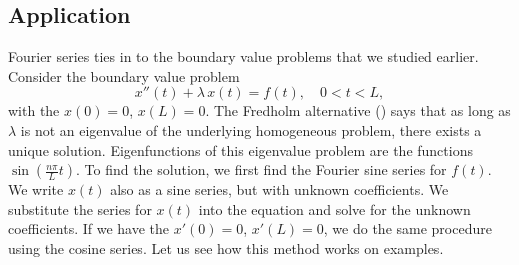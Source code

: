 \subsection{Application}

Fourier series ties in to the boundary value problems that
we studied earlier.
Consider the boundary value problem
\begin{equation*}
x''(t) + \lambda\, x(t) = f(t) , \quad 0 < t < L,
\end{equation*}
with the \emph{}
$x(0) = 0$, $x(L) = 0$.
The Fredholm alternative ()
says that
as long as $\lambda$ is not an eigenvalue of the underlying homogeneous
problem, there exists a unique solution.
Eigenfunctions of this eigenvalue problem are the functions
$\sin \left( \frac{n \pi}{L} t \right)$.
To find the solution,
we first find the Fourier sine series for $f(t)$.
We write $x(t)$ also as a sine series, but with unknown coefficients.  
We substitute the series for $x(t)$
into the equation and solve for the unknown coefficients.
If we have
the \emph{}
$x'(0) = 0$, $x'(L) = 0$, we do the same procedure using the cosine
series.
%
Let us see how this method works on examples.

